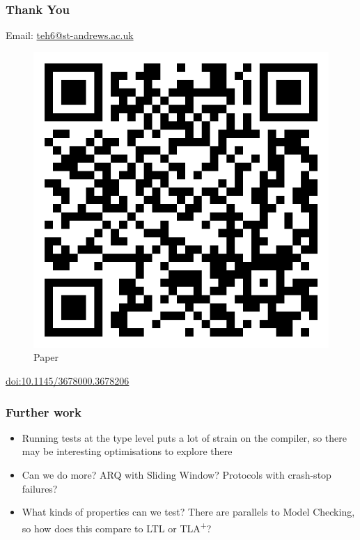 \documentclass[compress]{beamer}
\begin{document}
\begin{frame}
  \frametitle{Thank You}

  \begin{center}
    {\large Email: {\href{mailto:teh6@st-andrews.ac.uk}{teh6@st-andrews.ac.uk}}}

    \begin{figure}
      \caption{\large Paper}
      \vspace*{-3mm}
      \includegraphics[width=0.4\framewidth]{acm-qr.png}
    \end{figure}
    \vspace*{-5mm}
    \href{https://doi.org/10.1145/3678000.3678206}{doi:10.1145/3678000.3678206}
    \vspace*{-6mm}
  \end{center}
\end{frame}


\begin{frame}
  \frametitle{Further work}

  \large

  \begin{itemize}
    \item Running tests at the type level puts a lot of strain on the
          compiler, so there may be interesting optimisations to explore there
    \item Can we do more? ARQ with Sliding Window? Protocols with crash-stop
          failures?
    \item What kinds of properties can we test? There are parallels to Model
          Checking, so how does this compare to LTL or TLA\textsuperscript{+}?
  \end{itemize}

\end{frame}
\end{document}

